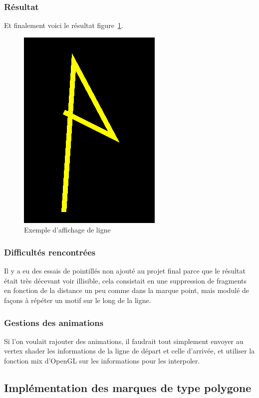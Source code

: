 \documentclass[12pt]{article}
\begin{document}
\subsubsection{Résultat}
Et finalement voici le résultat figure~\ref{fig:line}.
\begin{figure}[htp]
  \centering
  \includegraphics[scale=0.8]{images/line_example}
  \caption{Exemple d'affichage de ligne}
  \label{fig:line}
\end{figure}

\subsubsection{Difficultés rencontrées}
Il y a eu des essais de pointillés non ajouté au projet final parce que le résultat était très décevant voir illisible,
cela consistait en une suppression de fragments en fonction de la distance un peu comme dans la marque point, mais modulé
de façons à répéter un motif sur le long de la ligne.

\subsubsection{Gestions des animations}
Si l'on voulait rajouter des animations, il faudrait tout simplement envoyer au vertex shader
les informations de la ligne de départ et celle d'arrivée, et utiliser la fonction mix d'OpenGL
sur les informations pour les interpoler.

\subsection{Implémentation des marques de type polygone}
\end{document}
